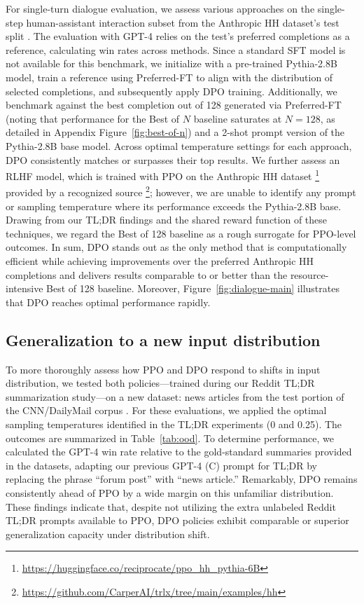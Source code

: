 For single-turn dialogue evaluation, we assess various approaches on the single-step human-assistant interaction subset from the Anthropic HH dataset’s test split \citep{bai2022training}. The evaluation with GPT-4 relies on the test’s preferred completions as a reference, calculating win rates across methods. Since a standard SFT model is not available for this benchmark, we initialize with a pre-trained Pythia-2.8B model, train a reference using Preferred-FT to align with the distribution of selected completions, and subsequently apply DPO training. Additionally, we benchmark against the best completion out of 128 generated via Preferred-FT (noting that performance for the Best of $N$ baseline saturates at $N = 128$, as detailed in Appendix Figure~\ref{fig:best-of-n}) and a 2-shot prompt version of the Pythia-2.8B base model. Across optimal temperature settings for each approach, DPO consistently matches or surpasses their top results. We further assess an RLHF model, which is trained with PPO on the Anthropic HH dataset \footnote{\url{https://huggingface.co/reciprocate/ppo_hh_pythia-6B}} provided by a recognized source \footnote{\url{https://github.com/CarperAI/trlx/tree/main/examples/hh}}; however, we are unable to identify any prompt or sampling temperature where its performance exceeds the Pythia-2.8B base. Drawing from our TL;DR findings and the shared reward function of these techniques, we regard the Best of 128 baseline as a rough surrogate for PPO-level outcomes. In sum, DPO stands out as the only method that is computationally efficient while achieving improvements over the preferred Anthropic HH completions and delivers results comparable to or better than the resource-intensive Best of 128 baseline. Moreover, Figure~\ref{fig:dialogue-main} illustrates that DPO reaches optimal performance rapidly.

\subsection{Generalization to a new input distribution}

To more thoroughly assess how PPO and DPO respond to shifts in input distribution, we tested both policies—trained during our Reddit TL;DR summarization study—on a new dataset: news articles from the test portion of the CNN/DailyMail corpus \citep{nallapati-etal-2016-abstractive}. For these evaluations, we applied the optimal sampling temperatures identified in the TL;DR experiments (0 and 0.25). The outcomes are summarized in Table~\ref{tab:ood}. To determine performance, we calculated the GPT-4 win rate relative to the gold-standard summaries provided in the datasets, adapting our previous GPT-4 (C) prompt for TL;DR by replacing the phrase ``forum post'' with ``news article.'' Remarkably, DPO remains consistently ahead of PPO by a wide margin on this unfamiliar distribution. These findings indicate that, despite not utilizing the extra unlabeled Reddit TL;DR prompts available to PPO, DPO policies exhibit comparable or superior generalization capacity under distribution shift.

